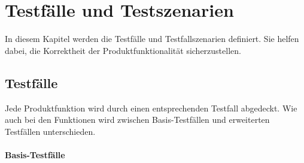 \section{Testfälle und Testszenarien}
In diesem Kapitel werden die Testfälle und Testfallszenarien definiert. Sie helfen dabei, die Korrektheit der Produktfunktionalität sicherzustellen.

\subsection{Testfälle}
\label{section:testfaelle}
Jede Produktfunktion wird durch einen entsprechenden Testfall abgedeckt. Wie auch bei den Funktionen wird zwischen Basis-Testfällen und erweiterten Testfällen unterschieden.
    
    \paragraph{\large Basis-Testfälle} $~$ \\
        
